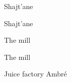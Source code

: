 \begin{frame}{Shajt'ane}
\begin{figure}[h]
\centering
{}
\end{figure}
\end{frame}

\begin{frame}{Shajt'ane}
\begin{figure}[h]
\centering
{}
\end{figure}
\end{frame}

\begin{frame}{The mill}
\begin{figure}[h]
\centering
{}
\end{figure}
\end{frame}

\begin{frame}{The mill}
\begin{figure}[h]
\centering
{}
\end{figure}
\end{frame}

\begin{frame}{Juice factory Ambré}
\begin{figure}[h]
\centering
{}
\end{figure}
\end{frame}

